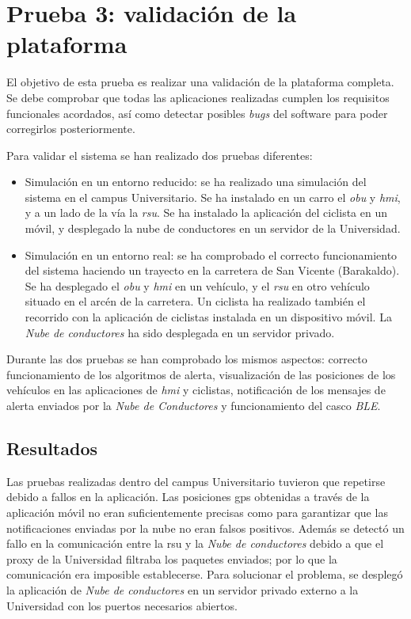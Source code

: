 \section{Prueba 3: validación de la plataforma}
El objetivo de esta prueba es realizar una validación de la plataforma completa. Se debe comprobar que todas las aplicaciones realizadas
cumplen los requisitos funcionales acordados, así como detectar posibles \emph{bugs} del software para poder corregirlos posteriormente.

Para validar el sistema se han realizado dos pruebas diferentes:

\begin{itemize}
	\item Simulación en un entorno reducido: se ha realizado una simulación	del sistema en el campus Universitario. Se ha instalado en un carro el	\emph{obu} y \emph{hmi}, y a un lado de la vía la \emph{rsu}. Se ha instalado la aplicación del ciclista en un móvil, y desplegado la nube de conductores en un servidor de la Universidad.
	
	\item Simulación en un entorno real: se ha comprobado el correcto funcionamiento del sistema haciendo un trayecto en la carretera de San Vicente (Barakaldo). Se ha desplegado el \emph{obu} y \emph{hmi}	en un vehículo,	y el \emph{rsu} en otro vehículo situado en el arcén de la carretera. Un ciclista ha realizado también el recorrido con la aplicación de ciclistas instalada en un dispositivo móvil. La \emph{Nube de conductores} ha sido desplegada en un servidor privado.
\end{itemize}

Durante las dos pruebas se han comprobado los mismos aspectos: correcto funcionamiento de los algoritmos de alerta, visualización de las posiciones de los vehículos en las aplicaciones de \emph{hmi} y ciclistas, notificación de los mensajes de alerta enviados por la \emph{Nube de Conductores} y funcionamiento del casco \emph{BLE}.

\subsection{Resultados}
Las pruebas realizadas dentro del campus Universitario tuvieron que repetirse debido a fallos en la aplicación. Las posiciones \gls{gps} obtenidas a través de la aplicación móvil no eran suficientemente precisas como para garantizar que las notificaciones enviadas por la nube no eran falsos positivos. Además se detectó un fallo en la comunicación entre la \gls{rsu} y la \emph{Nube de conductores} debido a que el proxy de la Universidad filtraba los paquetes enviados; por lo que la comunicación era imposible establecerse. Para solucionar el problema, se desplegó la aplicación de \emph{Nube de conductores} en un servidor privado externo a la Universidad con los puertos necesarios abiertos.


